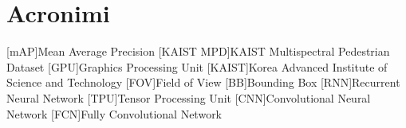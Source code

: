 \chapter*{Acronimi}
\begin{acronym}[CAGD]
    [mAP]{Mean Average Precision}
    [KAIST MPD]{KAIST Multispectral Pedestrian Dataset}
    [GPU]{Graphics Processing Unit}
    [KAIST]{Korea Advanced Institute of Science and Technology}
    [FOV]{Field of View}
    [BB]{Bounding Box}
    [RNN]{Recurrent Neural Network}
    [TPU]{Tensor Processing Unit}
    [CNN]{Convolutional Neural Network}
    [FCN]{Fully Convolutional Network}
\end{acronym}